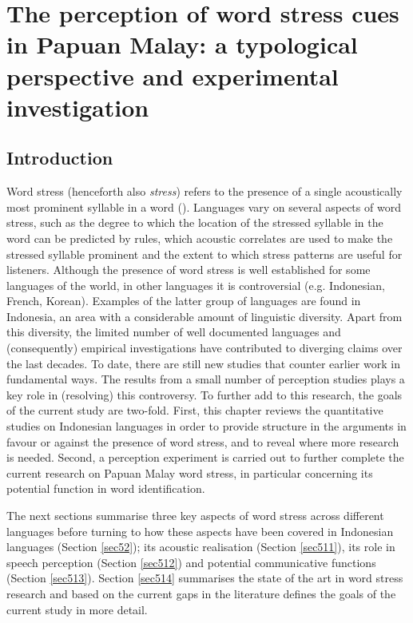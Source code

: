 \chapter[The perception of word stress cues in Papuan Malay]{The perception of word stress cues in Papuan Malay: a typological perspective and experimental investigation} \label{chGat}

\section{Introduction} \label{sec51}
Word stress (henceforth also \textit{stress}) refers to the presence of a single acoustically most prominent syllable in a word (\citealt{hyman_word-prosodic_2006}). Languages vary on several aspects of word stress, such as the degree to which the location of the stressed syllable in the word can be predicted by rules, which acoustic correlates are used to make the stressed syllable prominent and the extent to which stress patterns are useful for listeners. Although the presence of word stress is well established for some languages of the world, in other languages it is controversial (e.g. Indonesian, French, Korean). Examples of the latter group of languages are found in Indonesia, an area with a considerable amount of linguistic diversity. Apart from this diversity, the limited number of well documented languages and (consequently) empirical investigations have contributed to diverging claims over the last decades. To date, there are still new studies that counter earlier work in fundamental ways. The results from a small number of perception studies plays a key role in (resolving) this controversy. To further add to this research, the goals of the current study are two-fold. First, this chapter reviews the quantitative studies on Indonesian languages in order to provide structure in the arguments in favour or against the presence of word stress, and to reveal where more research is needed. Second, a perception experiment is carried out to further complete the current research on Papuan Malay word stress, in particular concerning its potential function in word identification.\par
The next sections summarise three key aspects of word stress across different languages before turning to how these aspects have been covered in Indonesian languages (Section \ref{sec52}); its acoustic realisation (Section \ref{sec511}), its role in speech perception (Section \ref{sec512}) and potential communicative functions (Section \ref{sec513}). Section \ref{sec514} summarises the state of the art in word stress research and based on the current gaps in the literature defines the goals of the current study in more detail.


